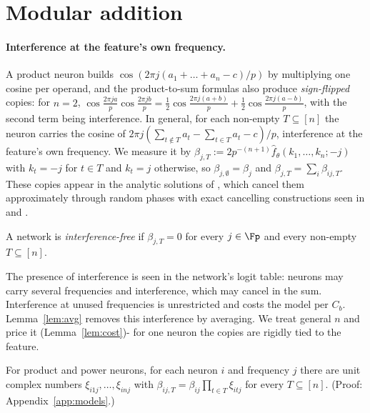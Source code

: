 \section{Modular addition}\label{sec:cyclic}


\paragraph{Interference at the feature's own frequency.}
A product neuron builds $\cos(2\pi j(a_1+\dots+a_n-c)/p)$ by multiplying one cosine per operand, and the product-to-sum formulas also produce \emph{sign-flipped} copies: for $n=2$, $\cos\frac{2\pi ja}p\cos\frac{2\pi jb}p=\frac12\cos\frac{2\pi j(a+b)}p+\frac12\cos\frac{2\pi j(a-b)}p$, with the second term being interference. In general, for each non-empty $T\subseteq[n]$ the neuron carries the cosine of $2\pi j(\sum_{t\notin T}a_t-\sum_{t\in T}a_t-c)/p$, interference at the feature's own frequency. We measure it by $\beta_{j,T}:=2p^{-(n+1)}\hat f_\theta(k_1,\dots,k_n;-j)$ with $k_t=-j$ for $t\in T$ and $k_t=j$ otherwise, so $\beta_{j,\emptyset}=\beta_j$ and $\beta_{j,T}=\sum_i\beta_{ij,T}$. These copies appear in the analytic solutions of \citet[Eqs.~10--11]{gromov2023grokking}, which cancel them approximately through random phases with exact cancelling constructions seen in \citet[App.~F.2]{morwani2024feature} and \citet[App.~E]{li2025nsum}.

\begin{definition}\label{def:if}
A network is \emph{interference-free} if $\beta_{j,T}=0$ for every $j\in\Fp$ and every non-empty $T\subseteq[n]$.
\end{definition}

The presence of interference is seen in the network's logit table: neurons may carry several frequencies and interference, which may cancel in the sum. Interference at unused frequencies is unrestricted and costs the model per $C_b$. Lemma~\ref{lem:avg} removes this interference by averaging. We treat general $n$ and price it (Lemma~\ref{lem:cost})- for one neuron the copies are rigidly tied to the feature.

\begin{lemma}[]\label{lem:sign}
For product and power neurons, for each neuron $i$ and frequency $j$ there are unit complex numbers $\xi_{i1j},\dots,\xi_{inj}$ with $\beta_{ij,T}=\beta_{ij}\prod_{t\in T}\xi_{itj}$ for every $T\subseteq[n]$. (Proof: Appendix~\ref{app:models}.)
\end{lemma}

